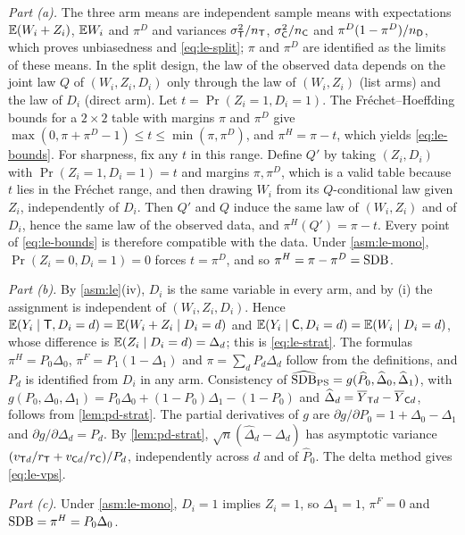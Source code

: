 \emph{Part (a).} The three arm means are independent sample means with expectations $\mathbb{E}(W_i+Z_i)$, $\mathbb{E} W_i$ and $\pi^D$ and variances $\sigma_{\mathsf{T}}^2/n_{\mathsf{T}}$, $\sigma_{\mathsf{C}}^2/n_{\mathsf{C}}$ and $\pi^D(1-\pi^D)/n_{\mathsf{D}}$, which proves unbiasedness and \eqref{eq:le-split}; $\pi$ and $\pi^D$ are identified as the limits of these means. In the split design, the law of the observed data depends on the joint law $Q$ of $(W_i,Z_i,D_i)$ only through the law of $(W_i,Z_i)$ (list arms) and the law of $D_i$ (direct arm). Let $t=\Pr(Z_i=1,D_i=1)$. The Fréchet--Hoeffding bounds for a $2\times2$ table with margins $\pi$ and $\pi^D$ give $\max(0,\pi+\pi^D-1)\le t\le\min(\pi,\pi^D)$, and $\pi^H=\pi-t$, which yields \eqref{eq:le-bounds}. For sharpness, fix any $t$ in this range. Define $Q'$ by taking $(Z_i,D_i)$ with $\Pr(Z_i=1,D_i=1)=t$ and margins $\pi,\pi^D$, which is a valid table because $t$ lies in the Fréchet range, and then drawing $W_i$ from its $Q$-conditional law given $Z_i$, independently of $D_i$. Then $Q'$ and $Q$ induce the same law of $(W_i,Z_i)$ and of $D_i$, hence the same law of the observed data, and $\pi^H(Q')=\pi-t$. Every point of \eqref{eq:le-bounds} is therefore compatible with the data. Under \cref{asm:le-mono}, $\Pr(Z_i=0,D_i=1)=0$ forces $t=\pi^D$, and so $\pi^H=\pi-\pi^D=\mathrm{SDB}$.

\emph{Part (b).} By \cref{asm:le}(iv), $D_i$ is the same variable in every arm, and by (i) the assignment is independent of $(W_i,Z_i,D_i)$. Hence $\mathbb{E}(Y_i\mid\mathsf{T},D_i=d)=\mathbb{E}(W_i+Z_i\mid D_i=d)$ and $\mathbb{E}(Y_i\mid\mathsf{C},D_i=d)=\mathbb{E}(W_i\mid D_i=d)$, whose difference is $\mathbb{E}(Z_i\mid D_i=d)=\Delta_d$; this is \eqref{eq:le-strat}. The formulas $\pi^H=P_0\Delta_0$, $\pi^F=P_1(1-\Delta_1)$ and $\pi=\sum_dP_d\Delta_d$ follow from the definitions, and $P_d$ is identified from $D_i$ in any arm. Consistency of $\widehat{\mathrm{SDB}}_{\mathrm{PS}}=g(\widehat P_0,\widehat\Delta_0,\widehat\Delta_1)$, with $g(P_0,\Delta_0,\Delta_1)=P_0\Delta_0+(1-P_0)\Delta_1-(1-P_0)$ and $\widehat\Delta_d=\overline Y_{\mathsf{T} d}-\overline Y_{\mathsf{C} d}$, follows from \cref{lem:pd-strat}. The partial derivatives of $g$ are $\partial g/\partial P_0=1+\Delta_0-\Delta_1$ and $\partial g/\partial\Delta_d=P_d$. By \cref{lem:pd-strat}, $\sqrt n(\widehat\Delta_d-\Delta_d)$ has asymptotic variance $(v_{\mathsf{T} d}/r_{\mathsf{T}}+v_{\mathsf{C} d}/r_{\mathsf{C}})/P_d$, independently across $d$ and of $\widehat P_0$. The delta method gives \eqref{eq:le-vps}.

\emph{Part (c).} Under \cref{asm:le-mono}, $D_i=1$ implies $Z_i=1$, so $\Delta_1=1$, $\pi^F=0$ and $\mathrm{SDB}=\pi^H=P_0\Delta_0$.

